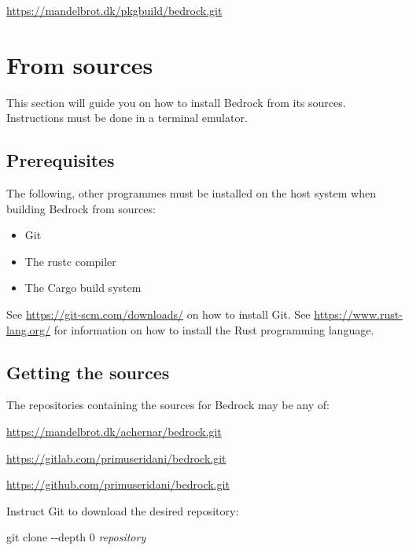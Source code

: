 \documentclass[a5paper, twoside]{report}
\begin{document}
			\begin{mdframed}
				\url{https://mandelbrot.dk/pkgbuild/bedrock.git}
			\end{mdframed}

		\section{From sources}
			This section will guide you on how to install Bedrock from its sources.
			Instructions must be done in a terminal emulator.

			\subsection{Prerequisites}
				The following, other programmes must be installed on the host system when building Bedrock from sources:

				\begin{multicols}{2}
					\begin{itemize}
						\item{Git}
						\item{The rustc compiler}
						\item{The Cargo build system}
					\end{itemize}
				\end{multicols}

				See \url{https://git-scm.com/downloads/} on how to install Git.
				See \url{https://www.rust-lang.org/} for information on how to install the Rust programming language.

			\subsection{Getting the sources}
				The repositories containing the sources for Bedrock may be any of:

				\begin{mdframed}
					\url{https://mandelbrot.dk/achernar/bedrock.git}

					\url{https://gitlab.com/primuseridani/bedrock.git}

					\url{https://github.com/primuseridani/bedrock.git}
				\end{mdframed}

				Instruct Git to download the desired repository:

				\begin{mdframed}
					\ttfamily
					git clone -{}-depth 0 \textit{repository}
				\end{mdframed}
\end{document}
